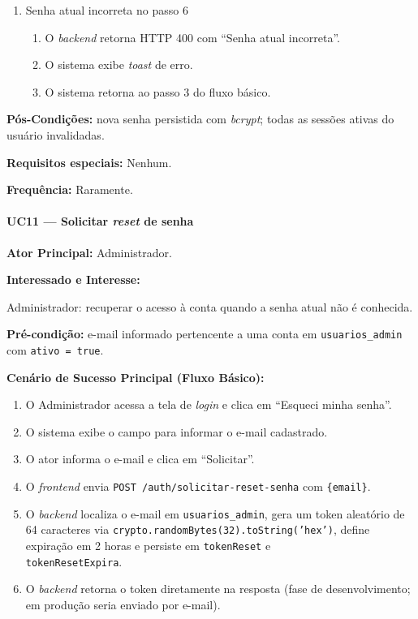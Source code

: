 \begin{enumerate}
  \renewcommand{\theenumi}{6a}
  \renewcommand{\labelenumi}{\theenumi.}
  \item Senha atual incorreta no passo 6
  \begin{enumerate}
  \item O \textit{backend} retorna HTTP 400 com
        ``Senha atual incorreta''.
  \item O sistema exibe \textit{toast} de erro.
  \item O sistema retorna ao passo 3 do fluxo básico.
  \end{enumerate}
\end{enumerate}

\textbf{Pós-Condições:} nova senha persistida com
\textit{bcrypt}; todas as sessões ativas do usuário
invalidadas.

\textbf{Requisitos especiais:} Nenhum.

\textbf{Frequência:} Raramente.

\paragraph{UC11 --- Solicitar \textit{reset} de senha}\hfill\break

\textbf{Ator Principal:} Administrador.

\textbf{Interessado e Interesse:}

Administrador: recuperar o acesso à conta quando a senha
atual não é conhecida.

\textbf{Pré-condição:} e-mail informado pertencente a uma
conta em \texttt{usuarios\_admin} com \texttt{ativo = true}.

\textbf{Cenário de Sucesso Principal (Fluxo Básico):}
\begin{enumerate}
  \item O Administrador acessa a tela de \textit{login}
        e clica em ``Esqueci minha senha''.
  \item O sistema exibe o campo para informar o e-mail
        cadastrado.
  \item O ator informa o e-mail e clica em ``Solicitar''.
  \item O \textit{frontend} envia
        \texttt{POST /auth/solicitar-reset-senha}
        com \texttt{\{email\}}.
  \item O \textit{backend} localiza o e-mail em
        \texttt{usuarios\_admin}, gera um token aleatório
        de 64 caracteres via
        \texttt{crypto.randomBytes(32).toString('hex')},
        define expiração em 2 horas e persiste em
        \texttt{tokenReset} e \\ \texttt{tokenResetExpira}.
  \item O \textit{backend} retorna o token diretamente
        na resposta (fase de desenvolvimento; em produção
        seria enviado por e-mail).
\end{enumerate}

